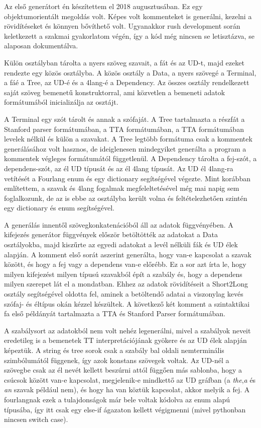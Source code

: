 Az első generátort én készítettem el 2018 augusztusában. 
Ez egy objektumorientált megoldás volt. 
Képes volt kommenteket is generálni, kezelni a rövidítéseket és könnyen bővíthető volt. 
Ugyanakkor rush development során keletkezett a szakmai gyakorlatom végén, így a kód még nincsen se letisztázva, se alaposan dokumentálva.

Külön osztályban tárolta a nyers szöveg szavait, a fát és az UD-t, majd ezeket rendezte egy közös osztályba. 
A közös osztály a Data, a nyers szövegé a Terminal, a fáé a Tree, az UD-é és a 4lang-é a Dependency. 
Az összes osztály rendelkezett saját szöveg bemenetű konstruktorral, ami közvetlen a bemeneti adatok formátumából inicializálja az osztájt.

A Terminal egy szót tárolt és annak a szófaját. 
A Tree tartalmazta a részfát a Stanford parser formátumában, a TTA formátumában, a TTA formátumában levelek nélkül és külön a szavakat. 
A Tree legtöbb formátuma csak a kommentek generálásához volt hasznos, de ideiglenesen mindegyiket generálta a program a kommentek végleges formátumától függetlenül. 
A Dependency tárolta a fej-szót, a dependens-szót, az él UD típusát és az él 4lang típusát. 
Az UD él 4lang-ra vetítését a Fourlang enum és egy dictionary segítségével végezte. 
Mint korábban említettem, a szavak és 4lang fogalmak megfeleltetésével még mai napig sem foglalkozunk, de az is ebbe az osztályba került volna és feltételezhetően szintén egy dictionary és enum segítségével.

A generálás innentől szövegkonkatenációból áll az adatok függvényében.
A kifejezés generátor függvények először betöltötték az adatokat a Data osztályokba, majd kiszűrte az egyedi adatokat a levél nélküli fák és UD élek alapján. A komment első sorát aszerint generálta, hogy van-e kapcsolat a szavak között, és hogy a fej vagy a dependens van-e  előrébb. Ez a sor azt írta le, hogy milyen kifejezést milyen típusú szavakból épít a szabály és, hogy a dependens milyen szerepet lát el a mondatban. Ehhez az adatok rövidítéseit a Short2Long osztály segítségével oldotta fel, aminek a betöltendő adatai  a viszonylag kevés szófaj- és éltípus okán kézzel készültek. A következő két komment a szintaktikai fa első példányát tartalmazta a TTA és Stanford Parser formátumában. 

A szabálysort az adatokból nem volt nehéz legenerálni, mivel a szabályok neveit eredetileg is a bemenetek TT interpretációjának gyökere és az UD élek alapján képeztük. A string és tree sorok csak a szabály bal oldali nemterminális szimbólumától függenek, így azok konstans szövegek voltak. Az UD-nél a szövegbe csak az él nevét kellett beszúrni attól függően más sablonba, hogy a csúcsok között van-e kapcsolat, megjelenik-e mindkettő az UD gráfban (a \textit{the},\textit{a} és \textit{an} szavak például nem), és hogy ha van köztük kapcsolat, akkor melyik a fej. A fourlangnak ezek a tulajdonságok már bele voltak kódolva az enum alapú típusába, így itt csak egy else-if ágazaton kellett végigmenni (mivel pythonban nincsen switch case).

